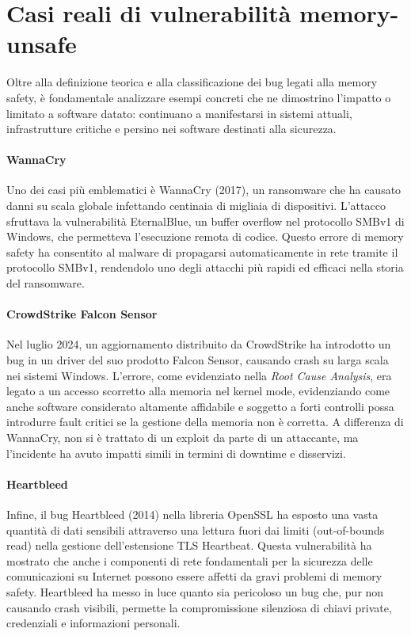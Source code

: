 \section{Casi reali di vulnerabilità memory-unsafe}
\label{sec:real_vulnerabilities}

Oltre alla definizione teorica e alla classificazione dei bug legati alla memory
safety, è fondamentale analizzare esempi concreti che ne dimostrino l'impatto o
limitato a software datato: continuano a manifestarsi in sistemi attuali,
infrastrutture critiche e persino nei software destinati alla sicurezza.

\paragraph{WannaCry}
\label{sec:wannacry} Uno dei casi più emblematici è WannaCry (2017), un
ransomware che ha causato danni su scala globale infettando centinaia di
migliaia di dispositivi. L'attacco sfruttava la vulnerabilità EternalBlue\cite{eternalblue},
un buffer overflow nel protocollo SMBv1 di Windows, che permetteva l'esecuzione
remota di codice. Questo errore di memory safety ha consentito al malware di propagarsi
automaticamente in rete tramite il protocollo SMBv1, rendendolo uno degli
attacchi più rapidi ed efficaci nella storia del ransomware.

\paragraph{CrowdStrike Falcon Sensor}
\label{sec:crowdstrike} Nel luglio 2024, un aggiornamento distribuito da
CrowdStrike ha introdotto un bug in un driver del suo prodotto Falcon Sensor, causando
crash su larga scala nei sistemi Windows. L'errore, come evidenziato nella \textit{Root
Cause Analysis}\cite{crowdstrike_rca}, era legato a un accesso scorretto alla
memoria nel kernel mode, evidenziando come anche software considerato altamente affidabile
e soggetto a forti controlli possa introdurre fault critici se la gestione della
memoria non è corretta. A differenza di WannaCry, non si è trattato di un exploit
da parte di un attaccante, ma l'incidente ha avuto impatti simili in termini di
downtime e disservizi.

\paragraph{Heartbleed}
\label{sec:heartbleed} Infine, il bug Heartbleed (2014) nella libreria OpenSSL
ha esposto una vasta quantità di dati sensibili attraverso una lettura fuori dai
limiti (out-of-bounds read) nella gestione dell'estensione TLS Heartbeat\cite{heartbleed}.
Questa vulnerabilità ha mostrato che anche i componenti di rete fondamentali per
la sicurezza delle comunicazioni su Internet possono essere affetti da gravi
problemi di memory safety. Heartbleed ha messo in luce quanto sia pericoloso un bug
che, pur non causando crash visibili, permette la compromissione silenziosa di chiavi
private, credenziali e informazioni personali.\\

